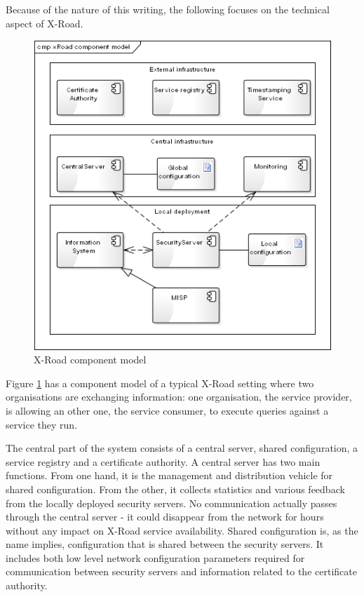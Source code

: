 \documentclass[10pt,a4paper]{article}
\begin{document}
\begin{appendices}
Because of the nature of this writing, the following focuses on the technical aspect of X-Road. 

\begin{figure}[ht]
	\begin{center}
		\includegraphics[width=.8\textwidth]{gfx/xroad.png}
		\caption{X-Road component model}
		\label{fig:X-Road}
	\end{center}
\end{figure}

Figure \ref{fig:X-Road} has a component model of a typical X-Road setting where two organisations are exchanging information: one organisation, the service provider, is allowing an other one, the service consumer, to execute queries against a service they run. 

The central part of the system consists of a central server, shared configuration, a service registry and a certificate authority. A central server has two main functions. From one hand, it is the management and distribution vehicle for shared configuration. From the other, it collects statistics and various feedback from the locally deployed security servers. No communication actually passes through the central server - it could disappear from the network for hours without any impact on X-Road service availability. Shared configuration is, as the name implies, configuration that is shared between the security servers. It includes both low level network configuration parameters required for communication between security servers and information related to the certificate authority. 


\end{appendices}
\end{document}
